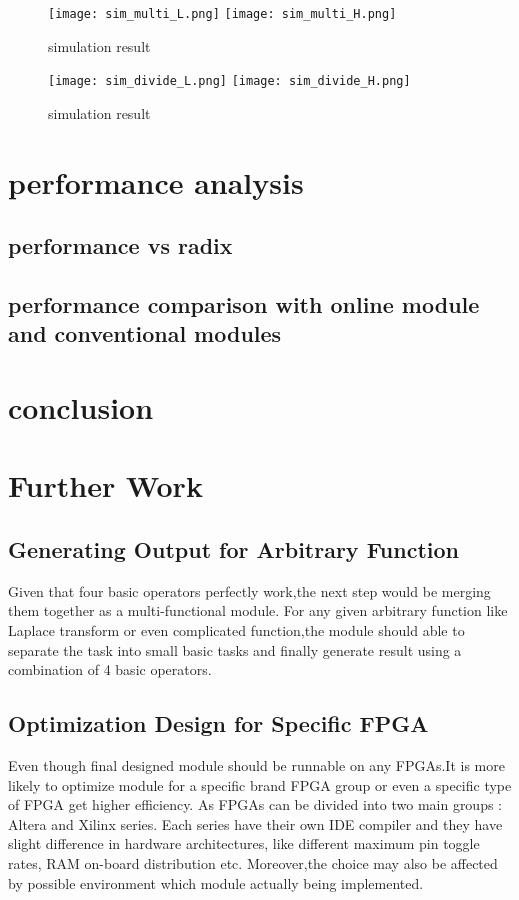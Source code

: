 \documentclass[10pt]{article}
\begin{document}
         \begin{figure}[H]
       \centering
       \texttt{[image: sim\_multi\_L.png]}
       \texttt{[image: sim\_multi\_H.png]}
       \caption{simulation result}
    \end{figure}
    
         \begin{figure}[H]
       \centering
       \texttt{[image: sim\_divide\_L.png]}
       \texttt{[image: sim\_divide\_H.png]}
       \caption{simulation result}
    \end{figure}
    
\section{performance analysis}  

\subsection{performance vs radix}

\subsection{performance comparison with online module and conventional modules }

\section{conclusion}


\section{Further Work}
\subsection{Generating Output for Arbitrary Function}
    Given that four basic operators perfectly work,the next step would be merging them together as a multi-functional module. For any given arbitrary function like Laplace transform or even complicated function,the module should able to separate the task into small basic tasks and finally generate result using a combination of 4 basic operators.
    
\subsection{Optimization Design for Specific FPGA}
    Even though final designed module should be runnable on any FPGAs.It is more likely to optimize module for a specific brand FPGA group or even a specific type of FPGA get higher efficiency. As FPGAs can be divided into two main groups : Altera and Xilinx series. Each series have their own IDE compiler and they have slight difference in hardware architectures, like different maximum pin toggle rates, RAM on-board distribution etc. Moreover,the choice may also be affected by possible environment which module actually being implemented.  
    
\end{document}
